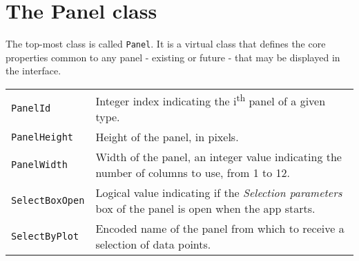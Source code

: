 \documentclass[]{book}
\begin{document}
\hypertarget{the-panel-class}{%
\section{The Panel class}\label{the-panel-class}}

The top-most class is called \texttt{Panel}.
It is a virtual class that defines the core properties common to any panel - existing or future - that may be displayed in the interface.

\begin{longtable}[]{@{}ll@{}}
\toprule
\endhead
\begin{minipage}[t]{0.47\columnwidth}\raggedright
\texttt{PanelId}\strut
\end{minipage} & \begin{minipage}[t]{0.47\columnwidth}\raggedright
Integer index indicating the i\textsuperscript{th} panel of a given type.\strut
\end{minipage}\tabularnewline
\begin{minipage}[t]{0.47\columnwidth}\raggedright
\texttt{PanelHeight}\strut
\end{minipage} & \begin{minipage}[t]{0.47\columnwidth}\raggedright
Height of the panel, in pixels.\strut
\end{minipage}\tabularnewline
\begin{minipage}[t]{0.47\columnwidth}\raggedright
\texttt{PanelWidth}\strut
\end{minipage} & \begin{minipage}[t]{0.47\columnwidth}\raggedright
Width of the panel, an integer value indicating the number of columns to use, from 1 to 12.\strut
\end{minipage}\tabularnewline
\begin{minipage}[t]{0.47\columnwidth}\raggedright
\texttt{SelectBoxOpen}\strut
\end{minipage} & \begin{minipage}[t]{0.47\columnwidth}\raggedright
Logical value indicating if the \emph{Selection parameters} box of the panel is open when the app starts.\strut
\end{minipage}\tabularnewline
\begin{minipage}[t]{0.47\columnwidth}\raggedright
\texttt{SelectByPlot}\strut
\end{minipage} & \begin{minipage}[t]{0.47\columnwidth}\raggedright
Encoded name of the panel from which to receive a selection of data points.\strut

\end{minipage}
\end{longtable}
\end{document}
